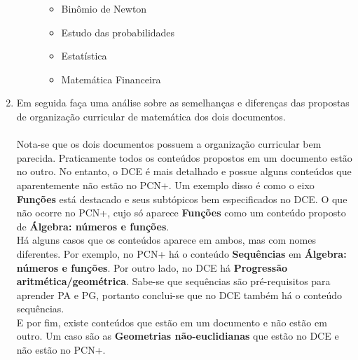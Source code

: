 \documentclass[a4paper, 12pt]{article}
\begin{document}
\begin{enumerate}
\begin{description}
\begin{itemize}
    \item Binômio de Newton
    \item Estudo das probabilidades
    \item Estatística
    \item Matemática Financeira \\
    \end{itemize}           
  \end{description}
\item Em seguida faça uma análise sobre as semelhanças e diferenças das propostas de organização curricular de matemática dos dois documentos. \\\\
  Nota-se que os dois documentos possuem a organização curricular bem parecida. Praticamente todos os conteúdos propostos em um documento estão no outro. No entanto, o DCE é mais detalhado e possue alguns conteúdos que aparentemente não estão no PCN+. Um exemplo disso é como o eixo \textbf{Funções} está destacado e seus subtópicos bem especificados no DCE. O que não ocorre no PCN+, cujo só aparece \textbf{Funções} como um conteúdo proposto de \textbf{Álgebra: números e funções}. \\
  Há alguns casos que os conteúdos aparece em ambos, mas com nomes diferentes. Por exemplo, no PCN+ há o conteúdo \textbf{Sequências} em \textbf{Álgebra: números e funções}. Por outro lado, no DCE há \textbf{Progressão aritmética/geométrica}. Sabe-se que sequências são pré-requisitos para aprender PA e PG, portanto conclui-se que no DCE também há o conteúdo sequências. \\
  E por fim, existe conteúdos que estão em um documento e não estão em outro. Um caso são as \textbf{Geometrias não-euclidianas} que estão no DCE e não estão no PCN+.
\end{enumerate}
\end{document}
